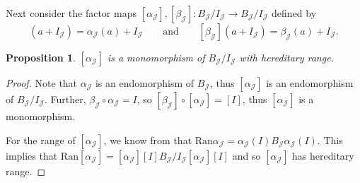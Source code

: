 \documentclass[10pt,a4paper]{amsart}
\newcommand{\fancyJ}{\mathcal{J}}
\numberwithin{equation}{section}
\newtheorem{Proposition}[Theorem]{Proposition}
 { \theoremstyle{definition}
\newtheorem{Definition}[Theorem]{Definition}
\newtheorem{Note}[Theorem]{Note}
\newtheorem{Example}[Theorem]{Example}
\newtheorem{Remark}[Theorem]{Remark} }
\begin{document}
Next consider the factor maps $[\alpha_\fancyJ],[\beta_\fancyJ]\colon B_\fancyJ/I_\fancyJ \to B_\fancyJ/I_\fancyJ$ defined by
\begin{equation*}
[\alpha_\fancyJ](a+I_\fancyJ) = \alpha_\fancyJ(a)+I_\fancyJ\qquad\text{and}\qquad [\beta_\fancyJ](a+I_\fancyJ)=\beta_\fancyJ(a)+I_\fancyJ.
\end{equation*}
\begin{Proposition}
$[\alpha_\fancyJ]$ is a monomorphism of $B_\fancyJ/I_\fancyJ$ with hereditary range.
\end{Proposition}
\begin{proof}
Note that $\alpha_\fancyJ$ is an endomorphism of $B_\fancyJ$, thus $[\alpha_\fancyJ]$ is an endomorphism of $B_\fancyJ/I_\fancyJ$. Further, $\beta_\fancyJ \circ \alpha_\fancyJ = I$, so $[\beta_\fancyJ]\circ[\alpha_\fancyJ]=[I]$, thus $[\alpha_\fancyJ]$ is a monomorphism.

For the range of $[\alpha_\fancyJ]$, we know from \cite{HKMP3} that
$
\mathrm{Ran} \alpha_\fancyJ = \alpha_\fancyJ(I)B_\fancyJ \alpha_\fancyJ(I)$.
This implies that
$
 \mathrm{Ran} [\alpha_\fancyJ] = [\alpha_\fancyJ][I]B_\fancyJ/I_\fancyJ [\alpha_\fancyJ][I]
$
and so $[\alpha_\fancyJ]$ has hereditary range.
\end{proof}
\end{document}
